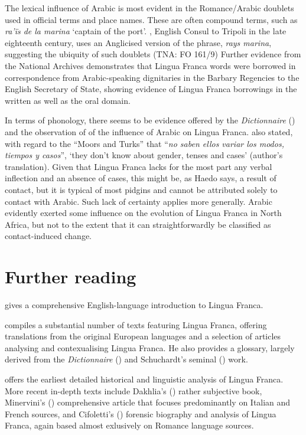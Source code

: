 \documentclass[output=paper]{langsci/langscibook}
\begin{document}
	The lexical influence of Arabic is most evident in the Romance/Arabic doublets used in official terms and place names. These are often compound terms, such as \textit{ra’ïs de la marina} ‘captain of the port’. , English Consul to Tripoli in the late eighteenth century, uses an Anglicised version of the phrase, \textit{rays marina}, suggesting the ubiquity of such doublets (TNA: FO 161/9) Further evidence from the National Archives \citep{Hopkins1982} demonstrates that Lingua Franca words were borrowed in correspondence from Arabic-speaking dignitaries in the Barbary Regencies to the English Secretary of State, showing evidence of Lingua Franca borrowings in the written as well as the oral domain. 
	
	In terms of phonology, there seems to be evidence offered by the \textit{Dictionnaire} (\citeyear{Anonymous1830}) and the observation of \citet{Haedo1612} of the influence of Arabic on Lingua Franca. \citet[24]{Haedo1612} also stated, with regard to the ``Moors and Turks'' that ``\textit{no saben ellos variar los modos, tiempos y casos}'', ‘they don’t know about gender, tenses and cases’ (author's translation). Given that Lingua Franca lacks for the most part any verbal inflection and an absence of cases, this might be, as Haedo says, a result of contact, but it is typical of most pidgins and cannot be attributed solely to contact with Arabic. Such lack of certainty applies more generally. Arabic evidently exerted some influence on the evolution of Lingua Franca in North Africa, but not to the extent that it can straightforwardly be classified as contact-induced change.
	
\section*{Further reading}
	
	\citet{Nolan2018} gives a comprehensive English-language introduction to Lingua Franca.
	
	\citet{Corré2005} compiles a substantial number of texts featuring Lingua Franca, offering translations from the original European languages and a selection of articles analysing and contexualising Lingua Franca. He also provides a glossary, largely derived from the \textit{Dictionnaire} (\citeyear{Anonymous1830}) and Schuchardt’s seminal (\citeyear{Schuchardt1909}) work.
	
	\citet{Schuchardt1909} offers the earliest detailed historical and linguistic analysis of Lingua Franca. More recent in-depth texts include Dakhlia's (\citeyear{Dakhlia2008}) rather subjective book, Minervini's (\citeyear{Minervini1996}) comprehensive article that focuses predominantly on Italian and French sources, and Cifoletti's (\citeyear{Cifoletti2004}) forensic biography and analysis of Lingua Franca, again based almost exlusively on Romance language sources. 
	
\end{document}
